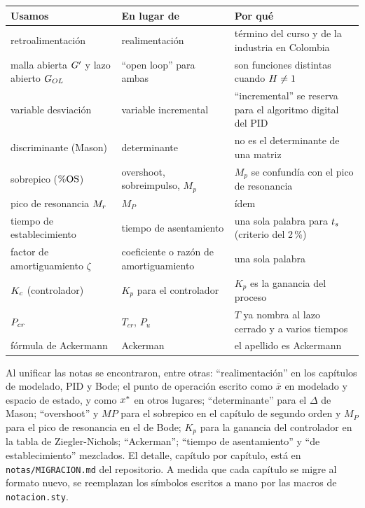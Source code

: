 \begin{center}\small
\begin{tabularx}{\linewidth}{@{}>{\raggedright\arraybackslash}p{3.6cm} >{\raggedright\arraybackslash}p{3.0cm} >{\raggedright\arraybackslash}X@{}}
\toprule
\textbf{Usamos} & \textbf{En lugar de} & \textbf{Por qué}\\
\midrule
retroalimentación & realimentación & término del curso y de la industria en Colombia\\
malla abierta $G'$ y lazo abierto $G_{OL}$ & ``open loop'' para ambas & son funciones distintas cuando $H\neq1$\\
variable desviación & variable incremental & ``incremental'' se reserva para el algoritmo digital del PID\\
discriminante (Mason) & determinante & no es el determinante de una matriz\\
sobrepico ($\%\mathrm{OS}$) & overshoot, sobreimpulso, $M_p$ & $M_p$ se confundía con el pico de resonancia\\
pico de resonancia $M_r$ & $M_P$ & ídem\\
tiempo de establecimiento & tiempo de asentamiento & una sola palabra para $t_s$ (criterio del 2\,\%)\\
factor de amortiguamiento $\zeta$ & coeficiente o razón de amortiguamiento & una sola palabra\\
$K_c$ (controlador) & $K_p$ para el controlador & $K_p$ es la ganancia del proceso\\
$P_{cr}$ & $T_{cr}$, $P_u$ & $T$ ya nombra al lazo cerrado y a varios tiempos\\
fórmula de Ackermann & Ackerman & el apellido es Ackermann\\
\bottomrule
\end{tabularx}
\end{center}

\begin{profundiza}
Al unificar las notas se encontraron, entre otras: ``realimentación'' en los capítulos de modelado, PID y Bode; el punto de operación escrito como $\bar{x}$ en modelado y espacio de estado, y como $x^{*}$ en otros lugares; ``determinante'' para el $\Delta$ de Mason; ``overshoot'' y $MP$ para el sobrepico en el capítulo de segundo orden y $M_P$ para el pico de resonancia en el de Bode; $K_p$ para la ganancia del controlador en la tabla de Ziegler-Nichols; ``Ackerman''; ``tiempo de asentamiento'' y ``de establecimiento'' mezclados. El detalle, capítulo por capítulo, está en \texttt{notas/MIGRACION.md} del repositorio. A medida que cada capítulo se migre al formato nuevo, se reemplazan los símbolos escritos a mano por las macros de \texttt{notacion.sty}.
\end{profundiza}

